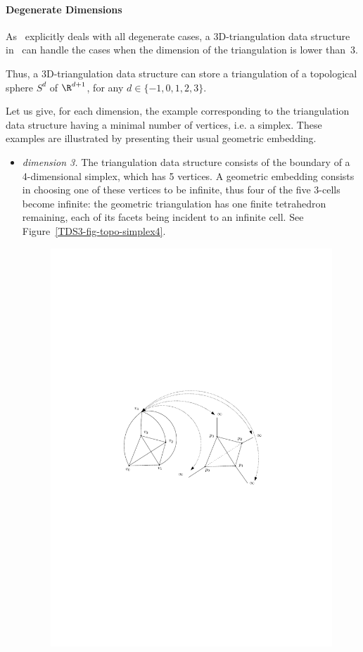 \paragraph{Degenerate Dimensions}
As \cgal\ explicitly deals with all degenerate cases, a
3D-triangulation data structure in \cgal\ can handle the cases when
the dimension of the triangulation is lower than~3.

Thus, a 3D-triangulation data structure can store a triangulation of a
topological sphere $S^d$ of $\R^{d+1}$, for any $d \in \{-1,0,1,2,3\}$. 

Let us give, for each dimension, the example corresponding to the
triangulation data structure having a minimal number of vertices, i.e. a 
simplex. These examples are illustrated by presenting their usual
geometric embedding. 
\begin{itemize}
\item \emph{dimension 3.} The triangulation data structure consists of
the boundary of a 4-dimensional simplex, which has 5 vertices. A
geometric embedding consists in choosing one of these vertices to be
infinite, thus four of the five 3-cells become infinite: the geometric
triangulation has one finite tetrahedron remaining, each of its facets
being incident to an infinite cell. See Figure~\ref{TDS3-fig-topo-simplex4}.
\begin{figure}
\begin{ccTexOnly}
\begin{center} 
\includegraphics{TriangulationDS_3/topo-simplex4}

\end{center}
\end{ccTexOnly}
\end{figure}
\end{itemize}
